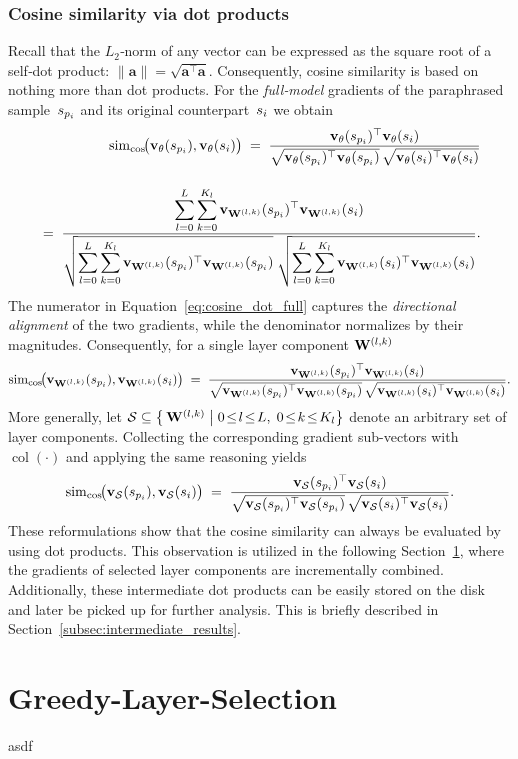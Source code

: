\subsubsection{Cosine similarity via dot products}
Recall that the $L_2$‑norm of any vector can be expressed as the square root of a self‑dot product:
$\|\mathbf{a}\|=\sqrt{\mathbf{a}^{\top}\mathbf{a}}$.
Consequently, cosine similarity is based on nothing more than dot products. For the \emph{full‑model} gradients of the paraphrased sample~$s_{p_i}$ and its original counterpart~$s_i$ we obtain
\begin{equation}
\begin{split}
      \simcos\!\bigl(\vXspi,\vXsi\bigr)
  \;=\;
  \frac{\vXspi^{\top}\vXsi}
       {\sqrt{\vXspi^{\top}\vXspi}\,
        \sqrt{\vXsi^{\top}\vXsi}}\\[12pt]
  \;=\;
  \frac{\displaystyle
        \sum_{l=0}^{L}\sum_{k=0}^{K_l}
        \vXspi[\Wlk]^{\top}\vXsi[\Wlk]}
       {\displaystyle
        \sqrt{\sum_{l=0}^{L}\sum_{k=0}^{K_l}
               \vXspi[\Wlk]^{\top}\vXspi[\Wlk]}\;
        \sqrt{\sum_{l=0}^{L}\sum_{k=0}^{K_l}
               \vXsi[\Wlk]^{\top}\vXsi[\Wlk]}}.
\end{split}
\label{eq:cosine_dot_full}
\end{equation}
The numerator in Equation~\ref{eq:cosine_dot_full} captures the \emph{directional alignment} of the two gradients, while the denominator normalizes by their magnitudes. Consequently, for a single layer component $\mathbf{W}^{(l,k)}$
\begin{equation}
  \simcos\!\bigl(\vXspi[\Wlk],\vXsi[\Wlk]\bigr)
  \;=\;
  \frac{\vXspi[\Wlk]^{\top}\vXsi[\Wlk]}
       {\sqrt{\vXspi[\Wlk]^{\top}\vXspi[\Wlk]}\,
        \sqrt{\vXsi[\Wlk]^{\top}\vXsi[\Wlk]}}.
  \label{eq:cosine_dot_layer}
\end{equation}
More generally, let $\mathcal{S}\subseteq \bigl\{\,\Wlk \;\big|\;0\!\le\! l\!\le\! L,\;0\!\le\! k\!\le\! K_l\bigr\}$ denote an arbitrary set of layer components. Collecting the corresponding gradient sub-vectors with
$\operatorname{col}(\cdot)$ and applying the same reasoning yields
\begin{equation}
  \simcos\!\bigl(\vXspi[\mathcal{S}],\vXsi[\mathcal{S}]\bigr)
  \;=\;
  \frac{\vXspi[\mathcal{S}]^{\top}\vXsi[\mathcal{S}]}
       {\sqrt{\vXspi[\mathcal{S}]^{\top}\vXspi[\mathcal{S}]}\,
        \sqrt{\vXsi[\mathcal{S}]^{\top}\vXsi[\mathcal{S}]}}.
  \label{eq:cosine_dot_subset}
\end{equation}
These reformulations show that the cosine similarity can always be evaluated by using dot products. This observation is utilized in the following Section~\ref{sec:greedy_layer_selection}, where the gradients of selected layer components are incrementally combined. Additionally, these intermediate dot products can be easily stored on the disk and later be picked up for further analysis. This is briefly described in Section~\ref{subsec:intermediate_results}.

\section{Greedy-Layer-Selection}\label{sec:greedy_layer_selection}
asdf